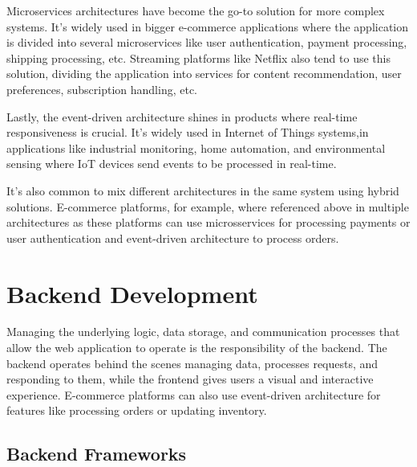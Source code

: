 Microservices architectures have become the go-to solution for more complex
systems. It's widely used in bigger e-commerce applications where the application
is divided into several microservices like user authentication, payment processing,
shipping processing, etc. Streaming platforms like Netflix also tend to use this
solution, dividing the application into services for content recommendation, user
preferences, subscription handling, etc.

Lastly, the event-driven architecture shines in products where real-time
responsiveness is crucial. It's widely used in Internet of Things systems,in
applications like industrial monitoring, home automation, and environmental
sensing where IoT devices send events to be processed in real-time.

It's also common to mix different architectures in the same system using
hybrid solutions. E-commerce platforms, for example, where referenced above in
multiple architectures as these platforms can use microsservices for processing
payments or user authentication and event-driven architecture to process orders.

\section{Backend Development}
Managing the underlying logic, data storage, and communication processes that
allow the web application to operate is the responsibility of the backend.
The backend operates behind the scenes managing data, processes requests, and
responding to them, while the frontend gives users a visual and interactive
experience. E-commerce platforms can also use event-driven architecture for
features like processing orders or updating inventory.

\subsection{Backend Frameworks}
